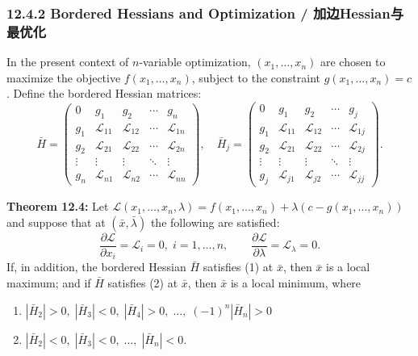 \subsubsection{12.4.2 Bordered Hessians and Optimization / 加边Hessian与最优化}

\begin{original}
In the present context of $n$-variable optimization, $(x_1,\ldots,x_n)$ are chosen to maximize the objective $f(x_1,\ldots,x_n)$, subject to the constraint $g(x_1,\ldots,x_n) = c$. Define the bordered Hessian matrices:
\[
\bar{H} = \begin{pmatrix}
0 & g_1 & g_2 & \cdots & g_n \\
g_1 & \mathcal{L}_{11} & \mathcal{L}_{12} & \cdots & \mathcal{L}_{1n} \\
g_2 & \mathcal{L}_{21} & \mathcal{L}_{22} & \cdots & \mathcal{L}_{2n} \\
\vdots & \vdots & \vdots & \ddots & \vdots \\
g_n & \mathcal{L}_{n1} & \mathcal{L}_{n2} & \cdots & \mathcal{L}_{nn}
\end{pmatrix}, \quad
\bar{H}_j = \begin{pmatrix}
0 & g_1 & g_2 & \cdots & g_j \\
g_1 & \mathcal{L}_{11} & \mathcal{L}_{12} & \cdots & \mathcal{L}_{1j} \\
g_2 & \mathcal{L}_{21} & \mathcal{L}_{22} & \cdots & \mathcal{L}_{2j} \\
\vdots & \vdots & \vdots & \ddots & \vdots \\
g_j & \mathcal{L}_{j1} & \mathcal{L}_{j2} & \cdots & \mathcal{L}_{jj}
\end{pmatrix}.
\]

\textbf{Theorem 12.4:} Let $\mathcal{L}(x_1,\ldots,x_n,\lambda) = f(x_1,\ldots,x_n) + \lambda(c - g(x_1,\ldots,x_n))$ and suppose that at $(\bar{x},\bar{\lambda})$ the following are satisfied:
\[
\frac{\partial \mathcal{L}}{\partial x_i} = \mathcal{L}_i = 0,\; i = 1,\ldots,n, \qquad \frac{\partial \mathcal{L}}{\partial \lambda} = \mathcal{L}_\lambda = 0.
\]
If, in addition, the bordered Hessian $\bar{H}$ satisfies (1) at $\bar{x}$, then $\bar{x}$ is a local maximum; and if $\bar{H}$ satisfies (2) at $\bar{x}$, then $\bar{x}$ is a local minimum, where
\begin{enumerate}
\item $|\bar{H}_2| > 0,\; |\bar{H}_3| < 0,\; |\bar{H}_4| > 0,\; \ldots,\; (-1)^n|\bar{H}_n| > 0$
\item $|\bar{H}_2| < 0,\; |\bar{H}_3| < 0,\; \ldots,\; |\bar{H}_n| < 0$.
\end{enumerate}
\end{original}
